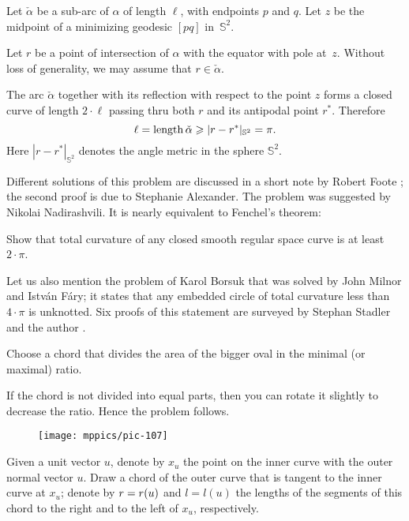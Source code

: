Let $\check\alpha$ be a sub-arc of $\alpha$ of length $\ell$, with endpoints $p$ and $q$. 
Let $z$ be the midpoint of a minimizing geodesic $[pq]$ in~$\mathbb{S}^2$. 

Let $r$ be a point of intersection of $\alpha$ with the equator with pole at~$z$. 
Without loss of generality, we may assume that $r\in\check\alpha$. 

The arc $\check\alpha$ together with its reflection with respect to the point $z$ forms a closed curve of length $2\cdot \ell$ passing thru both $r$ and its antipodal point $r^{*}$.
Therefore 
\[\ell=\operatorname{\rm length} \check\alpha\geqslant |r-r^{*}|_{\mathbb S^2}=\pi.\]
Here $|r-r^{*}|_{\mathbb S^2}$ 
denotes the angle metric in the sphere $\mathbb S^2$.\qeds

Different solutions of this problem are discussed in a short note by Robert Foote \cite{foote};
the second proof is due to Stephanie Alexander.
The problem was suggested by Nikolai Nadirashvili.
It is nearly equivalent to Fenchel's theorem: 

\begin{pr}
Show that total curvature of any closed smooth regular space curve is at least $2\cdot\pi$.
\end{pr}

Let us also mention the problem of Karol Borsuk that was solved by John Milnor and István Fáry;
it states that any embedded circle of total curvature less than $4\cdot\pi$ is unknotted.
Six proofs of this statement are surveyed by Stephan Stadler and the author \cite{petrunin-stadler-Fary-Milnor}.

Choose a chord that divides the area of the bigger oval in the minimal (or maximal) ratio.

If the chord is not divided into equal parts, then you can rotate it slightly
to decrease the ratio.
Hence the problem follows.
\qeds

\begin{wrapfigure}{r}{25 mm}
\vskip-4mm
\centering
\texttt{[image: mppics/pic-107]}
\end{wrapfigure}

Given a unit vector $u$, denote by $x_u$ the point on the inner curve
with the outer normal vector $u$.
Draw a chord of the outer curve that is tangent to the inner curve at $x_u$;
denote by $r\z=r(u)$ and $l=l(u)$ the lengths of the segments of this chord to the right and to the left of $x_u$, respectively.

